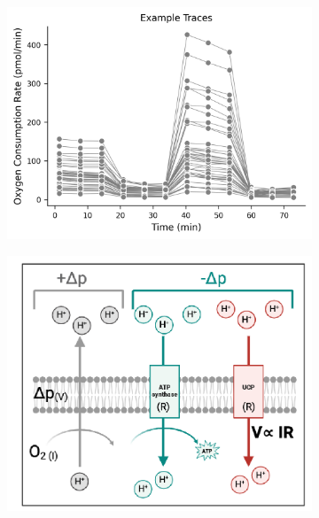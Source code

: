 \documentclass[12pt]{article}
\begin{document}
\begin{figure}[H]
\begin{subfigure}[t]{0.33\textwidth}
    \end{subfigure}
    \begin{subfigure}[t]{0.33\textwidth}
        \caption{}
        \includegraphics[width=\textwidth]{./extended_plots/rep_seahorse_curves_all.png}        
    \end{subfigure}   
    \begin{subfigure}[t]{0.33\textwidth}
        \caption{}
        \includegraphics[width=\textwidth]{./main_plots/uncoupling_cartoon.png}        
    \end{subfigure}  
    \begin{subfigure}[t]{0.33\textwidth}

\end{subfigure}
\end{figure}
\end{document}
